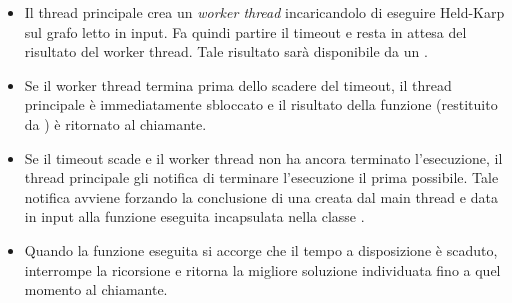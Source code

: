 \begin{itemize}
    \item Il thread principale crea un \textit{worker thread} incaricandolo di eseguire Held-Karp sul grafo letto in input. Fa quindi partire il timeout e resta in attesa del risultato del worker thread. Tale risultato sarà disponibile da un .
    \item Se il worker thread termina prima dello scadere del timeout, il thread principale è immediatamente sbloccato e il risultato della funzione (restituito da ) è ritornato al chiamante.
    \item Se il timeout scade e il worker thread non ha ancora terminato l'esecuzione, il thread principale gli notifica di terminare l'esecuzione il prima possibile. Tale notifica avviene forzando la conclusione di una  creata dal main thread e data in input alla funzione eseguita incapsulata nella classe .
    \item Quando la funzione eseguita si accorge che il tempo a disposizione è scaduto, interrompe la ricorsione e ritorna la migliore soluzione individuata fino a quel momento al chiamante.
\end{itemize}
